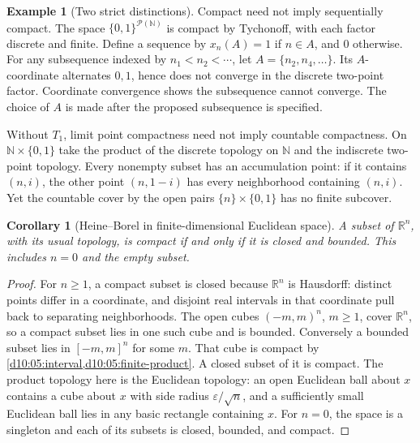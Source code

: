 \documentclass[11pt,oneside,openany]{book}
\newtheorem{corollary}[theorem]{Corollary}
\theoremstyle{definition}
\newtheorem{example}[theorem]{Example}
\theoremstyle{remark}
\newcommand{\R}{\mathbb R}\newcommand{\C}{\mathbb C}
\newcommand{\N}{\mathbb N}\newcommand{\Z}{\mathbb Z}\newcommand{\Q}{\mathbb Q}
\newcommand{\eps}{\varepsilon}
\newcommand{\powset}{\mathcal P}
\begin{document}
\begin{example}[Two strict distinctions]\label{d10:05:variant-counterexamples}
Compact need not imply sequentially compact. The space $\{0,1\}^{\powset(\N)}$ is compact by Tychonoff, with each factor discrete and finite. Define a sequence by $x_n(A)=1$ if $n\in A$, and $0$ otherwise. For any subsequence indexed by $n_1<n_2<\cdots$, let $A=\{n_2,n_4,\ldots\}$. Its $A$-coordinate alternates $0,1$, hence does not converge in the discrete two-point factor. Coordinate convergence shows the subsequence cannot converge. The choice of $A$ is made after the proposed subsequence is specified.

Without $T_1$, limit point compactness need not imply countable compactness. On $\N\times\{0,1\}$ take the product of the discrete topology on $\N$ and the indiscrete two-point topology. Every nonempty subset has an accumulation point: if it contains $(n,i)$, the other point $(n,1-i)$ has every neighborhood containing $(n,i)$. Yet the countable cover by the open pairs $\{n\}\times\{0,1\}$ has no finite subcover.
\end{example}

\begin{corollary}[Heine--Borel in finite-dimensional Euclidean space]\label{d10:05:heine-borel}
A subset of $\R^n$, with its usual topology, is compact if and only if it is closed and bounded. This includes $n=0$ and the empty subset.
\end{corollary}
\begin{proof}
For $n\ge1$, a compact subset is closed because $\R^n$ is Hausdorff: distinct points differ in a coordinate, and disjoint real intervals in that coordinate pull back to separating neighborhoods. The open cubes $(-m,m)^n$, $m\ge1$, cover $\R^n$, so a compact subset lies in one such cube and is bounded. Conversely a bounded subset lies in $[-m,m]^n$ for some $m$. That cube is compact by \cref{d10:05:interval,d10:05:finite-product}. A closed subset of it is compact. The product topology here is the Euclidean topology: an open Euclidean ball about $x$ contains a cube about $x$ with side radius $\eps/\sqrt n$, and a sufficiently small Euclidean ball lies in any basic rectangle containing $x$. For $n=0$, the space is a singleton and each of its subsets is closed, bounded, and compact.
\end{proof}
\end{document}
